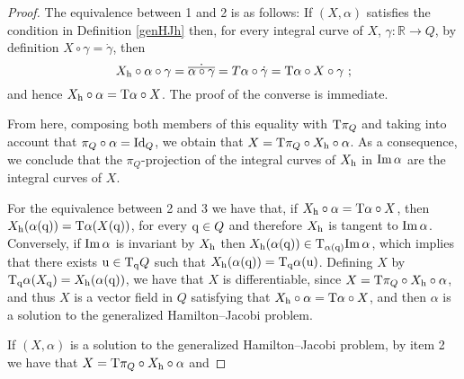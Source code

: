 \documentclass[12pt]{report}
\def\Real{\mathbb{R}}
\def\Tan{{\rm T}}
\begin{document}
\begin{proof}
The equivalence between 1 and 2 is as follows:
If $(X,\alpha)$ satisfies the condition in Definition \ref{genHJh} then, 
for every integral curve of $X$,
$\gamma\colon\Real\to Q$, by definition $X\circ\gamma=\dot\gamma$,
then
$$
X_{\rm h}\circ\alpha\circ\gamma=\dot{\overline{\alpha\circ\gamma}}=
T\alpha\circ\dot\gamma=\Tan\alpha\circ X\circ\gamma \ ;
$$
and hence $X_{\rm h}\circ\alpha=\Tan\alpha\circ X$.
The proof of the converse is immediate.

From here, composing both members of this equality with $\Tan\pi_Q$
and taking into account that $\pi_Q\circ\alpha={\rm Id}_Q$,
we obtain that $X=\Tan\pi_Q\circ X_{\rm h}\circ\alpha$.
As a consequence,
we conclude that the $\pi_Q$-projection of the integral curves of $X_{\rm h}$
in ${\rm Im}\,\alpha$ are the integral curves of $X$.

For the equivalence between 2 and 3 we have that,
if $X_{\rm h}\circ\alpha=\Tan\alpha\circ X$, then 
$X_{\rm h}(\alpha({\rm q}))=\Tan\alpha(X({\rm q}))$, for every ${\rm q}\in Q$
and therefore $X_{\rm h}$ is tangent to ${\rm Im}\,\alpha$.
Conversely, if ${\rm Im}\,\alpha$ is invariant by $X_{\rm h}$ then
$X_{\rm h}(\alpha({\rm q}))\in\Tan_{\alpha({\rm q})}{\rm Im}\,\alpha$,
which implies that there exists ${\rm u}\in\Tan_{\rm q}Q$ such that
$X_{\rm h}(\alpha({\rm q}))=\Tan_{\rm q}\alpha({\rm u})$. Defining
$X$ by $\Tan_{\rm q}\alpha(X_{\rm q})=X_{\rm h}(\alpha({\rm q}))$,
we have that $X$ is differentiable, since $X=\Tan\pi_Q\circ X_{\rm h}\circ\alpha$,
and thus $X$ is a vector field in $Q$ satisfying that
$X_{\rm h}\circ\alpha=\Tan\alpha\circ X$, and then $\alpha$ is a solution to the
generalized Hamilton--Jacobi problem.

If $(X,\alpha)$ is a solution to the generalized Hamilton--Jacobi problem, by item 2 we have that $X=\Tan\pi_Q\circ X_{\rm h}\circ\alpha$
and 


\end{proof}
\end{document}

